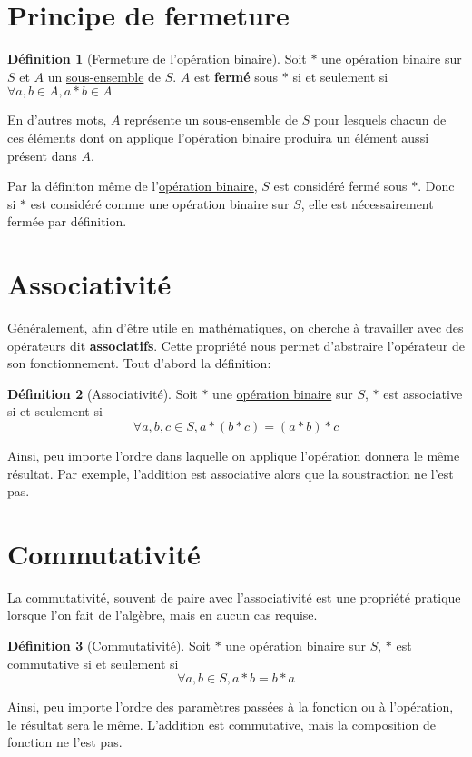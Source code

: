 \documentclass[12pt]{book}
\newcommand\todo[1]{\phantom{#1}}
\theoremstyle{definition}
\newtheorem{definition}{Définition}[section]
\begin{document}
\todo{Add Examples}

\section{Principe de fermeture}
\todo{Add lien avec topologie}
\begin{definition}[Fermeture de l'opération binaire]
    \label{def:fermeture}
    Soit $\ast$ une \hyperref[def:operation_binaire]{opération binaire} sur $S$ et $A$ un \hyperref[def:sous_ensemble]{sous-ensemble} de $S$. 
    $A$ est \textbf{fermé} sous $\ast$ si et seulement si $\forall a,b \in A, a \ast b \in A$
\end{definition}
En d'autres mots, $A$ représente un sous-ensemble de $S$ pour lesquels chacun de ces éléments dont on applique l'opération binaire
produira un élément aussi présent dans $A$.

Par la définiton même de l'\hyperref[def:operation_binaire]{opération binaire}, $S$ est considéré fermé sous $\ast$. Donc si $\ast$
est considéré comme une opération binaire sur $S$, elle est nécessairement fermée par définition.
\todo{Ajouter example table de Caley}

\section{Associativité}
Généralement, afin d'être utile en mathématiques, on cherche à travailler avec des opérateurs dit \textbf{associatifs}. Cette 
propriété nous permet d'abstraire l'opérateur de son fonctionnement. Tout d'abord la définition:
\begin{definition}[Associativité]
    \label{def:associativite}
    Soit $\ast$ une \hyperref[def:operation_binaire]{opération binaire} sur $S$, $\ast$ est associative si et seulement si 
    $$\forall a,b,c \in S, a \ast (b \ast c) = (a \ast b) \ast c$$
\end{definition}
Ainsi, peu importe l'ordre dans laquelle on applique l'opération donnera le même résultat. Par exemple, l'addition est associative alors
que la soustraction ne l'est pas.
\section{Commutativité}
La commutativité, souvent de paire avec l'associativité est une propriété pratique lorsque l'on fait de l'algèbre, mais en aucun cas requise.
\begin{definition}[Commutativité]
    \label{def:commutativite}
    Soit $\ast$ une \hyperref[def:operation_binaire]{opération binaire} sur $S$, $\ast$ est commutative si et seulement si 
    $$\forall a,b \in S, a \ast b = b \ast a$$
\end{definition}
Ainsi, peu importe l'ordre des paramètres passées à la fonction ou à l'opération, le résultat sera le même.
L'addition est commutative, mais la composition de fonction ne l'est pas.
\end{document}
